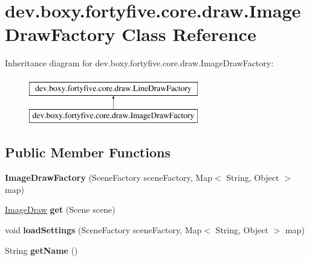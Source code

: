 \hypertarget{classdev_1_1boxy_1_1fortyfive_1_1core_1_1draw_1_1_image_draw_factory}{
\section{dev.boxy.fortyfive.core.draw.ImageDrawFactory Class Reference}
\label{dc/da8/classdev_1_1boxy_1_1fortyfive_1_1core_1_1draw_1_1_image_draw_factory}
}
Inheritance diagram for dev.boxy.fortyfive.core.draw.ImageDrawFactory:\begin{figure}[H]
\begin{center}
\leavevmode
\includegraphics[height=2.000000cm]{dc/da8/classdev_1_1boxy_1_1fortyfive_1_1core_1_1draw_1_1_image_draw_factory}
\end{center}
\end{figure}
\subsection*{Public Member Functions}
\begin{DoxyCompactItemize}
\item 
\hypertarget{classdev_1_1boxy_1_1fortyfive_1_1core_1_1draw_1_1_image_draw_factory_a184d255aadd44a705ffb97cbaf49417c}{
{\bfseries ImageDrawFactory} (SceneFactory sceneFactory, Map$<$ String, Object $>$ map)}
\label{dc/da8/classdev_1_1boxy_1_1fortyfive_1_1core_1_1draw_1_1_image_draw_factory_a184d255aadd44a705ffb97cbaf49417c}

\item 
\hypertarget{classdev_1_1boxy_1_1fortyfive_1_1core_1_1draw_1_1_image_draw_factory_a8e50824ff7268ece15658b5127eb9e10}{
\hyperlink{classdev_1_1boxy_1_1fortyfive_1_1core_1_1draw_1_1_image_draw}{ImageDraw} {\bfseries get} (Scene scene)}
\label{dc/da8/classdev_1_1boxy_1_1fortyfive_1_1core_1_1draw_1_1_image_draw_factory_a8e50824ff7268ece15658b5127eb9e10}

\item 
\hypertarget{classdev_1_1boxy_1_1fortyfive_1_1core_1_1draw_1_1_image_draw_factory_a463dd31a397d2c6172a695f810ba3d30}{
void {\bfseries loadSettings} (SceneFactory sceneFactory, Map$<$ String, Object $>$ map)}
\label{dc/da8/classdev_1_1boxy_1_1fortyfive_1_1core_1_1draw_1_1_image_draw_factory_a463dd31a397d2c6172a695f810ba3d30}

\item 
\hypertarget{classdev_1_1boxy_1_1fortyfive_1_1core_1_1draw_1_1_image_draw_factory_a1eb21054cb52beb113919f7b188885f0}{
String {\bfseries getName} ()}
\label{dc/da8/classdev_1_1boxy_1_1fortyfive_1_1core_1_1draw_1_1_image_draw_factory_a1eb21054cb52beb113919f7b188885f0}

\end{DoxyCompactItemize}
